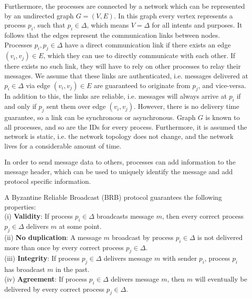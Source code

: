 Furthermore, the processes are connected by a network which can be represented by an undirected graph $G=(V,E)$. In this graph every vertex represents a process $p_i$, such that $p_i \in \Delta$, which means $V=\Delta$ for all intents and purposes. It follows that the edges represent the communication links between nodes.
Processes $p_i, p_j \in \Delta$ have a direct communication link if there exists an edge $(v_i, v_j) \in E$, which they can use to directly communicate with each other. If there exists no such link, they will have to rely on other processes to relay their messages. We assume that these links are authenticated, i.e.\jd{,} messages delivered at $p_i \in \Delta$ via edge $(v_i, v_j) \in E$ are guaranteed to originate from $p_j$, and vice-versa. In addition to this, the links are reliable, i.e. messages will always arrive at $p_i$ if and only if $p_j$ sent them over edge $(v_i, v_j)$. However, there is no delivery time guarantee, so a link can be synchronous or asynchronous. Graph $G$ is known to all processes, and so are the IDs for every process. Furthermore, it is assumed the network is static, i.e. the network topology does not change, and the network lives for a considerable amount of time.

In order to send message data to others, processes can add information to the message header, which can be used to uniquely identify the message and add protocol specific information.

A Byzantine Reliable Broadcast (BRB) protocol guarantees the following properties:\\
(i) \textbf{Validity}: If process $p_i \in \Delta$ broadcasts message $m$, then every correct process $p_j \in \Delta$ delivers $m$ at some point.\\
(ii) \textbf{No duplication}: A message $m$ broadcast by process $p_i \in \Delta$ is not delivered more than once by every correct process $p_j \in \Delta$.\\
(iii) \textbf{Integrity}: If process $p_j \in \Delta$ delivers message $m$ with sender $p_i$, process $p_i$ has broadcast $m$ in the past.\\
(iv) \textbf{Agreement}: If process $p_i \in \Delta$ delivers message $m$, then $m$ will eventually be delivered by every correct process $p_j \in \Delta$.



